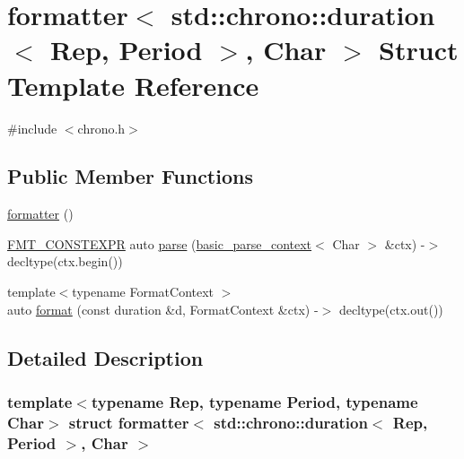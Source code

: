 \hypertarget{structformatter_3_01std_1_1chrono_1_1duration_3_01_rep_00_01_period_01_4_00_01_char_01_4}{}\section{formatter$<$ std\+:\+:chrono\+:\+:duration$<$ Rep, Period $>$, Char $>$ Struct Template Reference}
\label{structformatter_3_01std_1_1chrono_1_1duration_3_01_rep_00_01_period_01_4_00_01_char_01_4}


{\ttfamily \#include $<$chrono.\+h$>$}

\subsection*{Public Member Functions}
\begin{DoxyCompactItemize}
\item 
\hyperlink{structformatter_3_01std_1_1chrono_1_1duration_3_01_rep_00_01_period_01_4_00_01_char_01_4_ae08f63bed49f5aedf91ad62d3ecb8473}{formatter} ()
\item 
\hyperlink{core_8h_a69201cb276383873487bf68b4ef8b4cd}{F\+M\+T\+\_\+\+C\+O\+N\+S\+T\+E\+X\+PR} auto \hyperlink{structformatter_3_01std_1_1chrono_1_1duration_3_01_rep_00_01_period_01_4_00_01_char_01_4_a0b4553a087ee08ec032965fe1fc35ff4}{parse} (\hyperlink{classbasic__parse__context}{basic\+\_\+parse\+\_\+context}$<$ Char $>$ \&ctx) -\/$>$ decltype(ctx.\+begin())
\item 
{\footnotesize template$<$typename Format\+Context $>$ }\\auto \hyperlink{structformatter_3_01std_1_1chrono_1_1duration_3_01_rep_00_01_period_01_4_00_01_char_01_4_a8e85fb782f4dddcd3cb1fa207f2dd48c}{format} (const duration \&d, Format\+Context \&ctx) -\/$>$ decltype(ctx.\+out())
\end{DoxyCompactItemize}


\subsection{Detailed Description}
\subsubsection*{template$<$typename Rep, typename Period, typename Char$>$\newline
struct formatter$<$ std\+::chrono\+::duration$<$ Rep, Period $>$, Char $>$}



